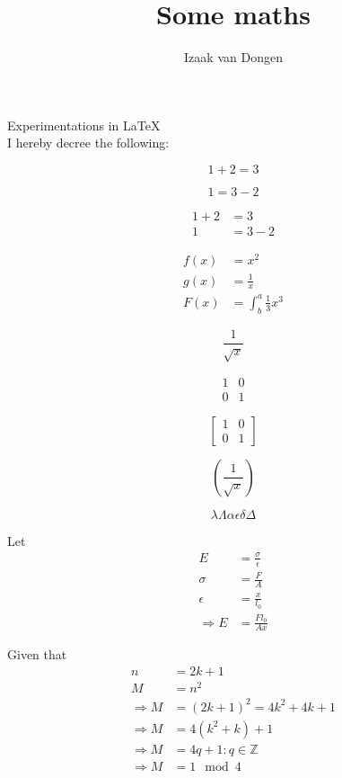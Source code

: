 \documentclass{article}
\title{Some maths}
\author{Izaak van Dongen}
\begin{document}
\maketitle
Experimentations in \LaTeX\\

I hereby decree the following:

\begin{equation*}
  1 + 2 = 3 
\end{equation*}

\begin{equation*}
  1 = 3 - 2
\end{equation*}

\begin{align*}
  1 + 2 &= 3\\
  1 &= 3 - 2
\end{align*}

\begin{align*}
  f(x) &= x^2\\
  g(x) &= \frac{1}{x}\\
  F(x) &= \int^a_b \frac{1}{3}x^3
\end{align*}

\begin{equation*}
\frac{1}{\sqrt{x}}
\end{equation*}

\begin{equation*}
\begin{matrix}
1 & 0\\
0 & 1
\end{matrix}
\end{equation*}

\begin{equation*}
\left[
\begin{matrix}
1 & 0\\
0 & 1
\end{matrix}
\right]
\end{equation*}

\begin{equation*}
\left(\frac{1}{\sqrt{x}}\right)
\end{equation*}

\begin{equation*}
\lambda \Lambda
\alpha
\epsilon
\delta \Delta
\end{equation*}

Let \begin{align*}
    E &= \frac{\sigma}{\epsilon}\\
    \sigma &= \frac{F}{A}\\
    \epsilon &= \frac{x}{l_0}\\
    \Rightarrow E &= \frac{Fl_0}{Ax}
\end{align*}

Given that
\begin{align*}
    n &= 2k + 1\\
    M &= n^{2}\\
    \Rightarrow M &= (2k + 1)^{2} = 4k^{2} + 4k + 1\\
    \Rightarrow M &= 4(k^{2} + k) + 1\\
    \Rightarrow M &= 4q + 1 : q \in \mathbb{Z}\\
    \Rightarrow M &= 1 \mod 4\\
\end{align*}
\end{document}
